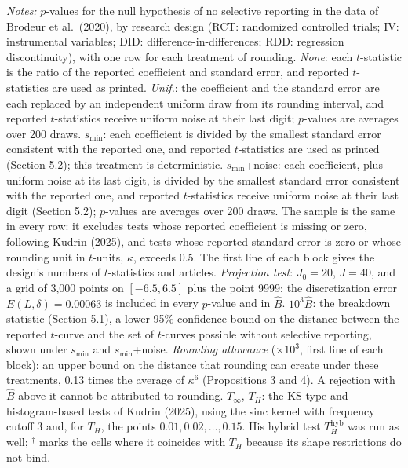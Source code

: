 \begin{table}[htbp]
\medskip
\begin{minipage}{\linewidth}
\footnotesize
\textit{Notes:} $p$-values for the null hypothesis of no selective reporting in the data of Brodeur et al.\ (2020), by research design (RCT: randomized controlled trials; IV: instrumental variables; DID: difference-in-differences; RDD: regression discontinuity), with one row for each treatment of rounding.
\textit{None}: each $t$-statistic is the ratio of the reported coefficient and standard error, and reported $t$-statistics are used as printed.
\textit{Unif.}: the coefficient and the standard error are each replaced by an independent uniform draw from its rounding interval, and reported $t$-statistics receive uniform noise at their last digit; $p$-values are averages over 200 draws.
$s_{\min}$: each coefficient is divided by the smallest standard error consistent with the reported one, and reported $t$-statistics are used as printed (Section 5.2); this treatment is deterministic.
$s_{\min}$+noise: each coefficient, plus uniform noise at its last digit, is divided by the smallest standard error consistent with the reported one, and reported $t$-statistics receive uniform noise at their last digit (Section 5.2); $p$-values are averages over 200 draws.
The sample is the same in every row: it excludes tests whose reported coefficient is missing or zero, following Kudrin (2025), and tests whose reported standard error is zero or whose rounding unit in $t$-units, $\kappa$, exceeds 0.5. The first line of each block gives the design's numbers of $t$-statistics and articles.
\textit{Projection test}: $J_0=20$, $J=40$, and a grid of 3,000 points on $[-6.5,6.5]$ plus the point 9999; the discretization error $E(L,\delta)=0.00063$ is included in every $p$-value and in $\widehat{B}$.
$10^3\widehat{B}$: the breakdown statistic (Section 5.1), a lower 95\% confidence bound on the distance between the reported $t$-curve and the set of $t$-curves possible without selective reporting, shown under $s_{\min}$ and $s_{\min}$+noise. \textit{Rounding allowance} ($\times 10^3$, first line of each block): an upper bound on the distance that rounding can create under these treatments, 0.13 times the average of $\kappa^6$ (Propositions 3 and 4). A rejection with $\widehat{B}$ above it cannot be attributed to rounding.
$T_\infty$, $T_H$: the KS-type and histogram-based tests of Kudrin (2025), using the sinc kernel with frequency cutoff 3 and, for $T_H$, the points $0.01,0.02,\ldots,0.15$. His hybrid test $T_H^{\mathrm{hyb}}$ was run as well; $^\dagger$ marks the cells where it coincides with $T_H$ because its shape restrictions do not bind.

\end{minipage}
\end{table}
